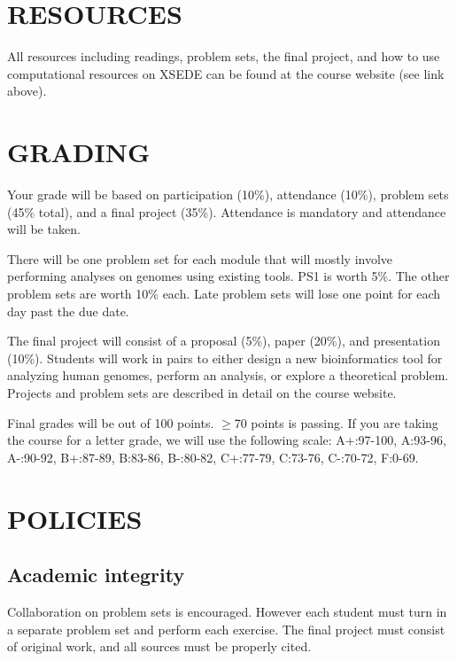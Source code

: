 \documentclass[12pt]{article}
\begin{document}

\section*{RESOURCES}
All resources including readings, problem sets, the final project, and how to use computational resources on XSEDE can be found at the course website (see link above).

\section*{GRADING}
Your grade will be based on participation (10\%), attendance (10\%), problem sets (45\% total), and a final project (35\%). Attendance is mandatory and attendance will be taken.

There will be one problem set for each module that will mostly involve performing analyses on genomes using existing tools. PS1 is worth 5\%. The other problem sets are worth 10\% each. Late problem sets will lose one point for each day past the due date.

The final project will consist of a proposal (5\%), paper (20\%), and presentation (10\%). Students will work in pairs to either design a new bioinformatics tool for analyzing human genomes, perform an analysis, or explore a theoretical problem. Projects and problem sets are described in detail on the course website.

Final grades will be out of 100 points. $\geq$70 points is passing. If you are taking the course for a letter grade, we will use the following scale: 
A+:97-100, A:93-96, A-:90-92,
B+:87-89, B:83-86, B-:80-82,
C+:77-79, C:73-76, C-:70-72,
F:0-69.

\section*{POLICIES}
\subsection*{Academic integrity}
Collaboration on problem sets is encouraged. However each student must turn in a separate problem set and perform each exercise. The final project must consist of original work, and all sources must be properly cited.
\end{document}
